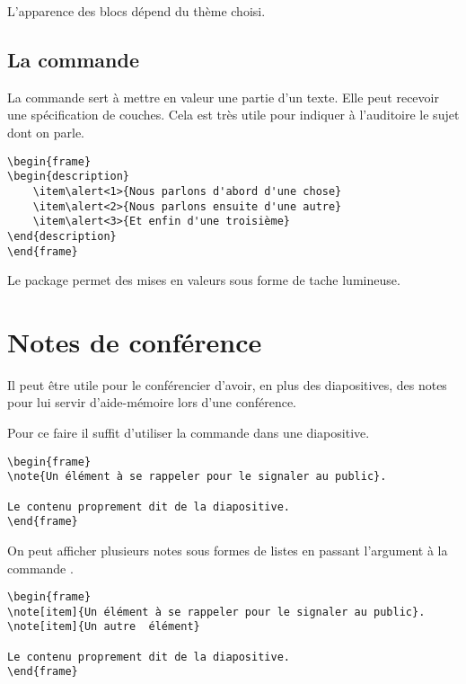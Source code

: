 L'apparence des blocs dépend du thème choisi.

\subsection{La commande }

La commande  sert à mettre en valeur une partie d'un texte. Elle peut recevoir une spécification de couches. Cela est très utile pour indiquer à l'auditoire le sujet dont on parle. 

\begin{verbatim}
\begin{frame}
\begin{description}
	\item\alert<1>{Nous parlons d'abord d'une chose}
	\item\alert<2>{Nous parlons ensuite d'une autre}
	\item\alert<3>{Et enfin d'une troisième}
\end{description}
\end{frame}
\end{verbatim}

\begin{plusloins}

Le package  permet des mises en valeurs sous forme de tache lumineuse.

\end{plusloins}
\section{Notes de conférence}

Il peut être utile pour le conférencier d'avoir, en plus des diapositives, des notes pour lui servir d'aide-mémoire lors d'une conférence.

Pour ce faire il suffit d'utiliser la commande  dans une diapositive.

\begin{verbatim}
\begin{frame}
\note{Un élément à se rappeler pour le signaler au public}.
	
Le contenu proprement dit de la diapositive.
\end{frame}
\end{verbatim}

On peut afficher plusieurs notes sous formes de listes en passant l'argument  à la commande .

\begin{verbatim}
\begin{frame}
\note[item]{Un élément à se rappeler pour le signaler au public}.
\note[item]{Un autre  élément}
	
Le contenu proprement dit de la diapositive.
\end{frame}
\end{verbatim}


